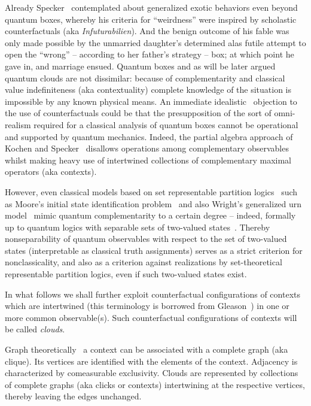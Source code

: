 \documentclass[%
  reprint,
  twocolumn,
 showpacs,
 showkeys,
 preprintnumbers,
 amsmath,amssymb,
 aps,
  prl,
  longbibliography,
 ]{revtex4-1}
\begin{document}
Already Specker~\cite{specker-60} contemplated about generalized exotic behaviors even beyond quantum boxes,
whereby his criteria for ``weirdness'' were inspired by scholastic counterfactuals
(aka {\it Infuturabilien}).
And
the benign outcome of his fable was only made possible by the unmarried daughter's determined alas futile attempt to open
the ``wrong'' -- according to her father's strategy -- box; at which point he gave in, and marriage ensued.
Quantum boxes and as will be later argued quantum clouds are not dissimilar: because
of complementarity
and classical value indefiniteness (aka contextuality)
complete knowledge of the situation is impossible by any known physical means.
An immediate idealistic~\cite{berkeley,stace,Goldschmidt2017-idealism}
objection to the use of counterfactuals could
be that the presupposition of the sort of omni-realism required for a classical analysis of quantum boxes
cannot be operational~\cite{bridgman} and supported by quantum mechanics.
Indeed, the partial algebra approach of Kochen and Specker~\cite{kochen2,kochen3,kochen1}
disallows operations among complementary observables
whilst making heavy use of intertwined collections of complementary maximal operators (aka contexts).


However, even classical models based on set representable partition logics~\cite{svozil-2001-eua}
such as Moore's initial state identification problem~\cite{e-f-moore}
and also Wright's generalized urn model~\cite{wright:pent,wright}
mimic quantum complementarity to a certain degree -- indeed,
formally up to quantum logics with separable sets of two-valued states~\cite[Theorem~0, p.~67]{kochen1}.
Thereby nonseparability of quantum observables with respect to the set
of two-valued states (interpretable as classical truth assignments)
serves as a strict criterion for nonclassicality,
and also as a criterion against realizations by set-theoretical representable partition logics,
even if such two-valued states exist.



In what follows we shall further exploit counterfactual
configurations of contexts which are intertwined (this terminology is borrowed from Gleason~\cite{Gleason})
in one or more common observable(s).
Such counterfactual configurations of contexts will be called {\em clouds}.

Graph theoretically~\cite[Appendix]{Godsil-Newman-2008}
a context can be associated with a complete graph (aka clique).
Its vertices are identified with the elements of the context.
Adjacency is characterized by comeasurable exclusivity.
Clouds are represented by collections of complete graphs (aka clicks or contexts) intertwining at the respective vertices,
thereby leaving the edges unchanged.
\end{document}
